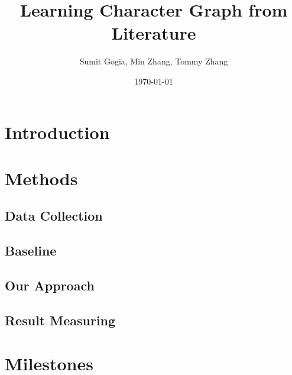 \documentclass[dvips,12pt]{article}
\begin{document}
\title{Learning Character Graph from Literature}
\author{Sumit Gogia, Min Zhang, Tommy Zhang}
\date{\today}

\maketitle

\section{Introduction}
\section{Methods}
\subsection{Data Collection}
\subsection{Baseline}
\subsection{Our Approach}
\subsection{Result Measuring}
\section{Milestones}
\end{document}
